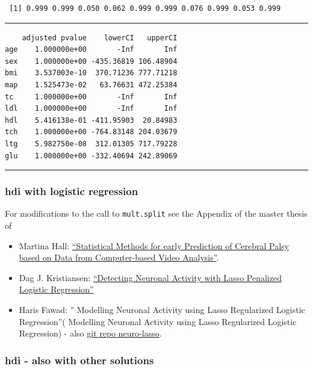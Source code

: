 \documentclass[
  letterpaper,
  DIV=11,
  numbers=noendperiod]{scrartcl}
\providecommand{\tightlist}{%
  \setlength{\itemsep}{0pt}\setlength{\parskip}{0pt}}\usepackage{longtable,booktabs,array}
\begin{document}
\begin{verbatim}
 [1] 0.999 0.999 0.050 0.062 0.999 0.999 0.076 0.999 0.053 0.999
\end{verbatim}

\begin{center}\rule{0.5\linewidth}{0.5pt}\end{center}

\normalsize

\begin{verbatim}
    adjusted pvalue    lowerCI   upperCI
age    1.000000e+00       -Inf       Inf
sex    1.000000e+00 -435.36819 106.48904
bmi    3.537003e-10  370.71236 777.71218
map    1.525473e-02   63.76631 472.25384
tc     1.000000e+00       -Inf       Inf
ldl    1.000000e+00       -Inf       Inf
hdl    5.416138e-01 -411.95903  20.84983
tch    1.000000e+00 -764.83148 204.03679
ltg    5.982750e-08  312.01305 717.79228
glu    1.000000e+00 -332.40694 242.89069
\end{verbatim}

\begin{center}\rule{0.5\linewidth}{0.5pt}\end{center}

\hypertarget{hdi-with-logistic-regression}{%
\subsubsection{hdi with logistic
regression}\label{hdi-with-logistic-regression}}

For modifications to the call to \texttt{mult.split} see the Appendix of
the master thesis of

\begin{itemize}
\tightlist
\item
  Martina Hall: \href{http://hdl.handle.net/11250/2453095}{``Statistical
  Methods for early Prediction of Cerebral Palsy based on Data from
  Computer-based Video Analysis''}.
\item
  Dag J. Kristiansen:
  \href{http://hdl.handle.net/11250/2624609}{``Detecting Neuronal
  Activity with Lasso Penalized Logistic Regression''}
\item
  Haris Fawad: '' Modelling Neuronal Activity using Lasso Regularized
  Logistic Regression''( Modelling Neuronal Activity using Lasso
  Regularized Logistic Regression) - also
  \href{https://github.com/harisf/neuro-lasso}{git repo neuro-lasso}.
\end{itemize}

\hypertarget{hdi---also-with-other-solutions}{%
\subsubsection{hdi - also with other
solutions}\label{hdi---also-with-other-solutions}}
\end{document}
